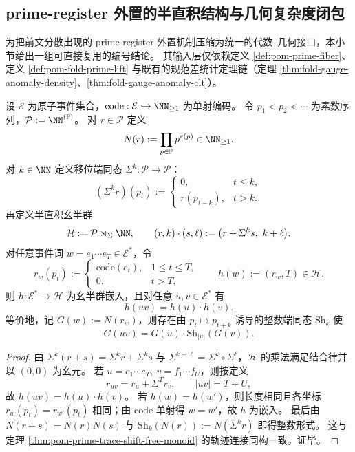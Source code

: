 \subsection{prime-register 外置的半直积结构与几何复杂度闭包}\label{subsec:conclusion-prime-register-semidirect-godel-geometry}
为把前文分散出现的 prime-register 外置机制压缩为统一的代数--几何接口，本小节给出一组可直接复用的编号结论。
其输入层仅依赖定义 \ref{def:pom-prime-fiber}、定义 \ref{def:pom-fold-prime-lift} 与既有的规范差统计定理链（定理 \ref{thm:fold-gauge-anomaly-density}、\ref{thm:fold-gauge-anomaly-clt}）。

\begin{theorem}\label{thm:conclusion-godel-semidirect-law}
设 \(\mathcal E\) 为原子事件集合，\(\mathrm{code}:\mathcal E\hookrightarrow \NN_{\ge 1}\) 为单射编码。
令 \(p_1<p_2<\cdots\) 为素数序列，\(\mathcal P:=\NN^{(\mathbb P)}\)。
对 \(r\in\mathcal P\) 定义
\[
N(r):=\prod_{p\in\mathbb P}p^{r(p)}\in\NN_{\ge 1}.
\]
对 \(k\in\NN\) 定义移位端同态 \(\Sigma^k:\mathcal P\to\mathcal P\)：
\[
(\Sigma^k r)(p_t):=
\begin{cases}
0,&t\le k,\\
r(p_{t-k}),&t>k.
\end{cases}
\]
再定义半直积幺半群
\[
\mathcal H:=\mathcal P\rtimes_{\Sigma}\NN,\qquad
(r,k)\cdot(s,\ell):=\bigl(r+\Sigma^k s,\ k+\ell\bigr).
\]
对任意事件词 \(w=e_1\cdots e_T\in\mathcal E^\ast\)，令
\[
r_w(p_t):=
\begin{cases}
\mathrm{code}(e_t),&1\le t\le T,\\
0,&t>T,
\end{cases}
\qquad
h(w):=(r_w,T)\in\mathcal H.
\]
则 \(h:\mathcal E^\ast\to\mathcal H\) 为幺半群嵌入，且对任意 \(u,v\in\mathcal E^\ast\) 有
\[
h(uv)=h(u)\cdot h(v).
\]
等价地，记 \(G(w):=N(r_w)\)，则存在由 \(p_t\mapsto p_{t+k}\) 诱导的整数端同态 \(\mathrm{Sh}_k\) 使
\[
G(uv)=G(u)\cdot \mathrm{Sh}_{|u|}(G(v)).
\]
\end{theorem}
\begin{proof}
由 \(\Sigma^k(r+s)=\Sigma^k r+\Sigma^k s\) 与 \(\Sigma^{k+\ell}=\Sigma^k\circ\Sigma^\ell\)，\(\mathcal H\) 的乘法满足结合律并以 \((0,0)\) 为幺元。
若 \(u=e_1\cdots e_T,\ v=f_1\cdots f_U\)，则按定义
\[
r_{uv}=r_u+\Sigma^T r_v,\qquad |uv|=T+U,
\]
故 \(h(uv)=h(u)\cdot h(v)\)。
若 \(h(w)=h(w')\)，则长度相同且各坐标 \(r_w(p_t)=r_{w'}(p_t)\) 相同；由 \(\mathrm{code}\) 单射得 \(w=w'\)，故 \(h\) 为嵌入。
最后由 \(N(r+s)=N(r)N(s)\) 与 \(\mathrm{Sh}_k(N(r)):=N(\Sigma^k r)\) 即得整数形式。
这与定理 \ref{thm:pom-prime-trace-shift-free-monoid} 的轨迹连接同构一致。证毕。
\end{proof}

